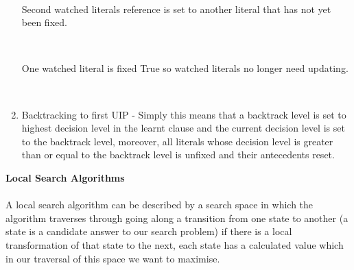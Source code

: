 \documentclass[12pt,a4paper]{article}
\begin{document}
\begin{enumerate}
{\begin{center}
\\
\end{center}
Second watched literals reference is set to another literal that has not yet been fixed.
\begin{center}
\\
\end{center}
One watched literal is fixed True so watched literals no longer need updating.
\begin{center}
\\
\end{center}
}
\item{Backtracking to first UIP \cite{firstUIPbacktrack} - Simply this means that a backtrack level is set to highest decision level in the learnt clause and the current decision level is set to the backtrack level, moreover, all literals whose decision level is greater than or equal to the backtrack level is unfixed and their antecedents reset.}

\end{enumerate}
\newpage
{\bf Local Search Algorithms}\\\\
A local search algorithm can be described by a search space in which the algorithm traverses through going along a transition from one state to another (a state is a candidate answer to our search problem) if there is a local transformation of that state to the next, each state has a calculated value which in our traversal of this space we want to maximise.
\end{document}
